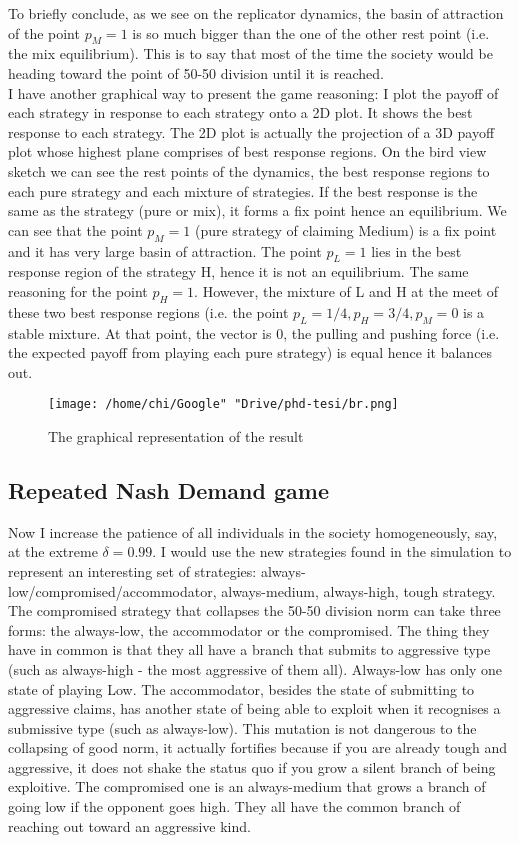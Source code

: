 \documentclass[12.5pt]{report}
\begin{document}
To briefly conclude, as we see on the replicator dynamics, the basin of attraction of the point $p_M = 1$ is so much bigger than the one of the other rest point (i.e. the mix equilibrium). This is to say that most of the time the society would be heading toward the point of 50-50 division until it is reached.\\ 

I have another graphical way to present the game reasoning: I plot the payoff of each strategy in response to each strategy onto a 2D plot. It shows the best response to each strategy. The 2D plot is actually the projection of a 3D payoff plot whose highest plane comprises of best response regions. On the bird view sketch we can see the rest points of the dynamics, the best response regions to each pure strategy and each mixture of strategies. If the best response is the same as the strategy (pure or mix), it forms a fix point hence an equilibrium. We can see that the point $p_M = 1$ (pure strategy of claiming Medium) is a fix point and it has very large basin of attraction. The point $p_L = 1$ lies in the best response region of the strategy H, hence it is not an equilibrium. The same reasoning for the point $p_H = 1$. However, the mixture of L and H at the meet of these two best response regions (i.e. the point $p_L = 1/4, p_H = 3/4, p_M = 0$ is a stable mixture. At that point, the vector is 0, the pulling and pushing force (i.e. the expected payoff from playing each pure strategy) is equal hence it balances out.

\begin{figure}[h!]
\texttt{[image: /home/chi/Google" "Drive/phd-tesi/br.png]}
\caption{The graphical representation of the result}
\end{figure}

\subsection{Repeated Nash Demand game}

Now I increase the patience of all individuals in the society homogeneously, say, at the extreme $\delta = 0.99$. I would use the new strategies found in the simulation to represent an interesting set of strategies: always-low/compromised/accommodator, always-medium, always-high, tough strategy. The compromised strategy that collapses the 50-50 division norm can take three forms: the always-low, the accommodator or the compromised. The thing they have in common is that they all have a branch that submits to aggressive type (such as always-high - the most aggressive of them all). Always-low has only one state of playing Low. The accommodator, besides the state of submitting to aggressive claims, has another state of being able to exploit when it recognises a submissive type (such as always-low). This mutation is not dangerous to the collapsing of good norm, it actually fortifies because if you are already tough and aggressive, it does not shake the status quo if you grow a silent branch of being exploitive. The compromised one is an always-medium that grows a branch of going low if the opponent goes high. They all have the common branch of reaching out toward an aggressive kind.
\end{document}
